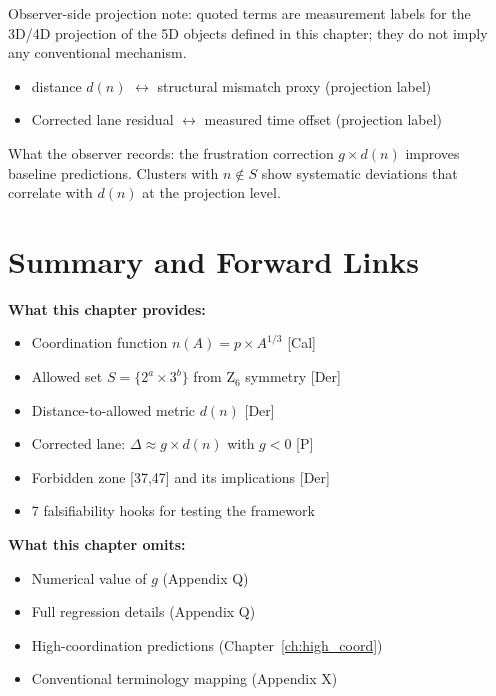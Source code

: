 \begin{observerbox}
Observer-side projection note: quoted terms are measurement labels for the
3D/4D projection of the 5D objects defined in this chapter; they do not
imply any conventional mechanism.

\begin{itemize}
    \item \Frustration{} distance $d(n)$ $\leftrightarrow$ structural mismatch proxy (projection label)
    \item Corrected lane residual $\leftrightarrow$ measured time offset (projection label)
\end{itemize}

What the observer records: the frustration correction $g \times d(n)$
improves baseline predictions. Clusters with $n \notin S$ show systematic
deviations that correlate with $d(n)$ at the projection level.
\end{observerbox}

\section{Summary and Forward Links}
\label{sec:frustrated:summary}

\begin{resultbox}
    \textbf{What this chapter provides:}
    \begin{itemize}
        \item Coordination function $n(A) = p \times A^{1/3}$ [Cal]
        \item Allowed set $S = \{2^a \times 3^b\}$ from Z$_6$ symmetry [Der]
        \item Distance-to-allowed metric $d(n)$ [Der]
        \item Corrected lane: $\Delta \approx g \times d(n)$ with $g < 0$ [P]
        \item Forbidden zone [37,47] and its implications [Der]
        \item 7 falsifiability hooks for testing the framework
    \end{itemize}

    \textbf{What this chapter omits:}
    \begin{itemize}
        \item Numerical value of $g$ (Appendix Q)
        \item Full regression details (Appendix Q)
        \item High-coordination predictions (Chapter~\ref{ch:high_coord})
        \item Conventional terminology mapping (Appendix X)
    \end{itemize}
\end{resultbox}

